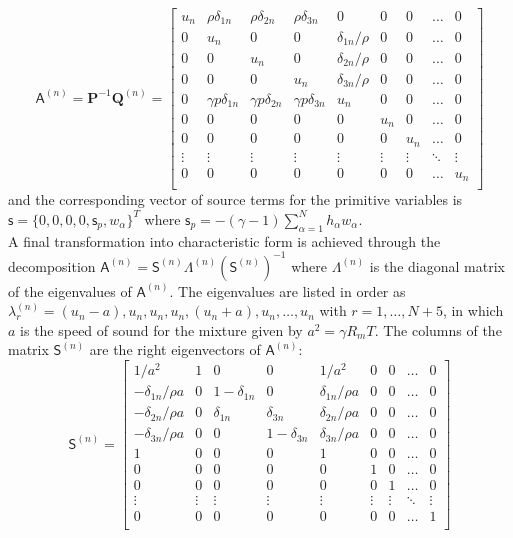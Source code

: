 \documentclass[dvips]{article}
\begin{document}
\begin{equation}
{\mathsf A}^{(n)} = {\mathbf P}^{-1}{\mathbf Q}^{(n)} =
\left[
\begin{array}{ccccccccc}
u_{n} & \rho\delta_{1n} & \rho\delta_{2n} & \rho\delta_{3n} & 0 & 0 & 0 &
\ldots & 0 \\
0 & u_{n} & 0 & 0 & \delta_{1n}/\rho & 0 & 0 & \ldots & 0 \\
0 & 0 & u_{n} & 0 & \delta_{2n}/\rho & 0 & 0 & \ldots & 0 \\
0 & 0 & 0 & u_{n} & \delta_{3n}/\rho & 0 & 0 & \ldots & 0 \\
0 & \gamma p\delta_{1n} & \gamma p\delta_{2n} & \gamma p\delta_{3n} &  u_{n} &
0 & 0 & \ldots & 0 \\
0 & 0 & 0 & 0 & 0 & u_{n} & 0 & \ldots & 0 \\
0 & 0 & 0 & 0 & 0 & 0 & u_{n} & \ldots & 0 \\
\vdots & \vdots & \vdots & \vdots & \vdots & \vdots & \vdots & \ddots &
\vdots \\
0 & 0 & 0 & 0 & 0 & 0 & 0 & \ldots & u_{n} \\
\end{array}
\right]
\end{equation}
and the corresponding vector of source terms for the primitive variables is 
${\mathsf s} = \{0,0,0,0,{\mathsf s}_{p},w_{\alpha}\}^{T}$
where ${\mathsf s}_{p} = -(\gamma-1)\sum_{\alpha=1}^{N}h_{\alpha}w_{\alpha}$.
\\[2mm]
A final transformation into characteristic form is achieved through the
decomposition
${\mathsf A}^{(n)} = {\mathsf S}^{(n)}\Lambda^{(n)}
\left({\mathsf S}^{(n)}\right)^{-1}$
where $\Lambda^{(n)}$ is the diagonal matrix of the eigenvalues of
${\mathsf A}^{(n)}$.  The eigenvalues are listed in order as
$\lambda_{r}^{(n)} =
{(u_{n}-a),u_{n},u_{n},u_{n},(u_{n}+a),u_{n},\ldots,u_{n}}$
with $r=1,\ldots,N+5$,
in which $a$ is the speed of sound for the mixture given by
$a^{2}=\gamma R_{m} T$.
The columns of the matrix ${\mathsf S}^{(n)}$ 
are the right eigenvectors of ${\mathsf A}^{(n)}$:
\begin{equation}
{\mathsf S}^{(n)} = 
\left[
\begin{array}{ccccccccc}
1/a^{2} & 1 & 0 & 0 & 1/a^{2} & 0 & 0 & \ldots & 0 \\
-\delta_{1n}/{\rho a} & 0 & 1-\delta_{1n} & 0 & \delta_{1n}/{\rho a}
& 0 & 0 & \ldots & 0 \\
-\delta_{2n}/{\rho a} & 0 & \delta_{1n} & \delta_{3n} & \delta_{2n}/{\rho a}
& 0 & 0 & \ldots & 0 \\
-\delta_{3n}/{\rho a} & 0 & 0 & 1-\delta_{3n} & \delta_{3n}/{\rho a}
& 0 & 0 & \ldots & 0 \\
1 & 0 & 0 & 0 & 1 & 0 & 0 & \ldots & 0 \\
0 & 0 & 0 & 0 & 0 & 1 & 0 & \ldots & 0 \\
0 & 0 & 0 & 0 & 0 & 0 & 1 & \ldots & 0 \\
\vdots & \vdots & \vdots & \vdots & \vdots & \vdots & \vdots & \ddots &
\vdots \\
0 & 0 & 0 & 0 & 0 & 0 & 0 & \ldots & 1 \\
\end{array}
\right]
\end{equation}
\end{document}
